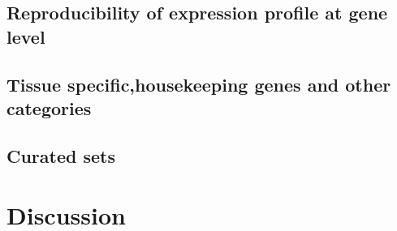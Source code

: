     \subsection{Reproducibility of expression profile at gene level}\label{subsec:Trans_ReproExpresGene}

    \subsection{Tissue specific,housekeeping genes and other categories}\label{subsec:Trans_TissueSpeAndHK}

    \subsection{Curated sets}\label{subsec:Trans_curatedSets}

\section{Discussion}\label{sec:Trans_discussion}



